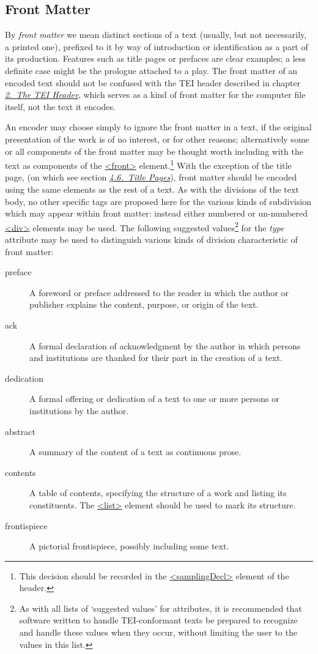\subsection[{Front Matter}]{Front Matter}\label{DSFRONT}\par
By \textit{front matter} we mean distinct sections of a text (usually, but not necessarily, a printed one), prefixed to it by way of introduction or identification as a part of its production. Features such as title pages or prefaces are clear examples; a less definite case might be the prologue attached to a play. The front matter of an encoded text should not be confused with the TEI header described in chapter \textit{\hyperref[HD]{2.\ The TEI Header}}, which serves as a kind of front matter for the computer file itself, not the text it encodes.\par
An encoder may choose simply to ignore the front matter in a text, if the original presentation of the work is of no interest, or for other reasons; alternatively some or all components of the front matter may be thought worth including with the text as components of the \hyperref[TEI.front]{<front>} element.\footnote{This decision should be recorded in the \hyperref[TEI.samplingDecl]{<samplingDecl>} element of the header.} With the exception of the title page, (on which see section \textit{\hyperref[DSTITL]{4.6.\ Title Pages}}), front matter should be encoded using the same elements as the rest of a text. As with the divisions of the text body, no other specific tags are proposed here for the various kinds of subdivision which may appear within front matter: instead either numbered or un-numbered \hyperref[TEI.div]{<div>} elements may be used. The following suggested values\footnote{As with all lists of ‘suggested values’ for attributes, it is recommended that software written to handle TEI-conformant texts be prepared to recognize and handle these values when they occur, without limiting the user to the values in this list.} for the {\itshape type} attribute may be used to distinguish various kinds of division characteristic of front matter: \begin{description}

\item[{preface}]A foreword or preface addressed to the reader in which the author or publisher explains the content, purpose, or origin of the text.
\item[{ack}]A formal declaration of acknowledgment by the author in which persons and institutions are thanked for their part in the creation of a text.
\item[{dedication}]A formal offering or dedication of a text to one or more persons or institutions by the author.
\item[{abstract}]A summary of the content of a text as continuous prose.
\item[{contents}]A table of contents, specifying the structure of a work and listing its constituents. The \hyperref[TEI.list]{<list>} element should be used to mark its structure.
\item[{frontispiece}]A pictorial frontispiece, possibly including some text.
\end{description} \par
